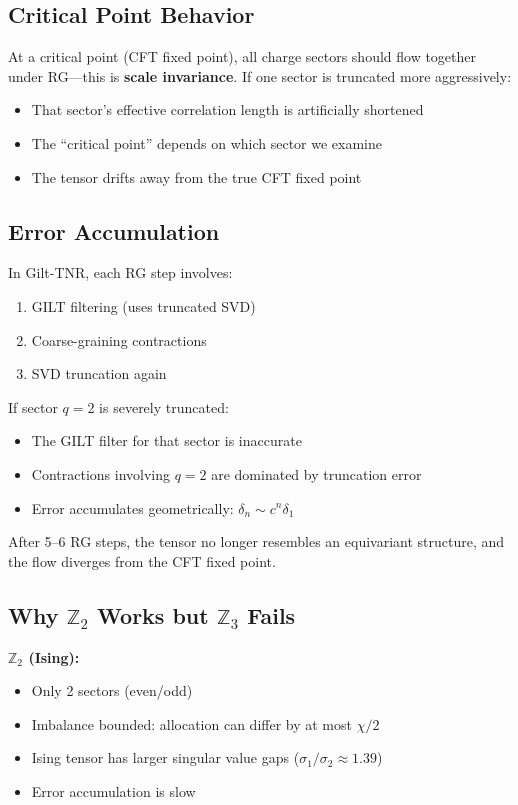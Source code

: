 \documentclass{article}
\begin{document}
\subsection{Critical Point Behavior}

At a critical point (CFT fixed point), all charge sectors should flow together under RG---this is \textbf{scale invariance}. If one sector is truncated more aggressively:
\begin{itemize}
    \item That sector's effective correlation length is artificially shortened
    \item The ``critical point'' depends on which sector we examine
    \item The tensor drifts away from the true CFT fixed point
\end{itemize}

\subsection{Error Accumulation}

In Gilt-TNR, each RG step involves:
\begin{enumerate}
    \item GILT filtering (uses truncated SVD)
    \item Coarse-graining contractions
    \item SVD truncation again
\end{enumerate}

If sector $q=2$ is severely truncated:
\begin{itemize}
    \item The GILT filter for that sector is inaccurate
    \item Contractions involving $q=2$ are dominated by truncation error
    \item Error accumulates geometrically: $\delta_n \sim c^n \delta_1$
\end{itemize}

After 5--6 RG steps, the tensor no longer resembles an equivariant structure, and the flow diverges from the CFT fixed point.

\subsection{Why $\mathbb{Z}_2$ Works but $\mathbb{Z}_3$ Fails}

\textbf{$\mathbb{Z}_2$ (Ising):}
\begin{itemize}
    \item Only 2 sectors (even/odd)
    \item Imbalance bounded: allocation can differ by at most $\chi/2$
    \item Ising tensor has larger singular value gaps ($\sigma_1/\sigma_2 \approx 1.39$)
    \item Error accumulation is slow
\end{itemize}
\end{document}
